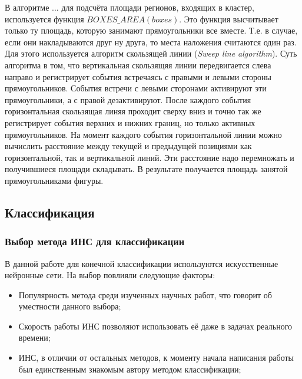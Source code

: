 \documentclass[12pt]{report}
\newenvironment{myItemize}{
 	\vspace{-10pt}
	\begin{itemize}[nolistsep]
}{\end{itemize}}
\begin{document}
В алгоритме ...  для подсчёта площади регионов, входящих в кластер, используется функция $BOXES\_AREA(boxes)$. Это 
функция высчитывает только ту площадь, которую занимают прямоугольники все вместе. Т.е. в случае, если они 
накладываются друг ну друга, то места наложения считаются один раз. Для этого используется алгоритм скользящей линии 
(\textit{Sweep line algorithm}). Суть алгоритма в том, что вертикальная скользящяя линии передвигается слева направо 
и регистрирует события встречаясь с правыми и левыми стороны прямоугольников. События встречи с левыми сторонами 
активируют эти прямоугольники, а с правой дезактивируют. После каждого события горизонтальная скользящая линяя 
проходит сверху вниз и точно так же регистрирует события верхних и нижних границ, но только активных прямоугольников. 
На момент каждого события горизонтальной линии можно вычислить расстояние между текущей и предыдущей позициями как 
горизонтальной, так и вертикальной линий. Эти расстояние надо перемножать и получившиеся площади складывать. В 
результате получается площадь занятой прямоугольниками фигуры.


\subsection{Классификация}

\subsubsection{Выбор метода ИНС для классификации}
В данной работе для конечной классификации используются искусственные нейронные сети. На выбор повлияли следующие 
факторы:
\begin{myItemize}
\item Популярность метода среди изученных научных работ, что говорит об уместности данного выбора;
\item Скорость работы ИНС позволяют использовать её даже в задачах реального времени;
\item ИНС, в отличии от остальных методов, к моменту начала написания работы был единственным знакомым автору методом 
классификации;
\end{myItemize}
\end{document}
